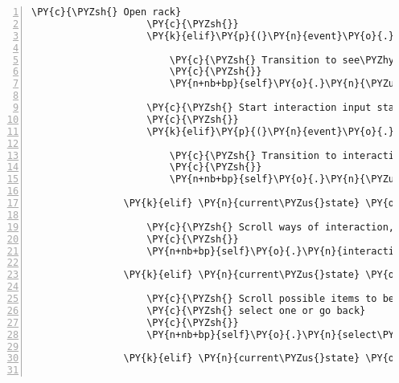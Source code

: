 \begin{Verbatim}[commandchars=\\\{\},numbers=left,firstnumber=1,stepnumber=1]
                    \PY{c}{\PYZsh{} Open rack}
                    \PY{c}{\PYZsh{}}
                    \PY{k}{elif}\PY{p}{(}\PY{n}{event}\PY{o}{.}\PY{n}{key} \PY{o}{==} \PY{n}{pygame}\PY{o}{.}\PY{n}{K\PYZus{}q}\PY{p}{)}\PY{p}{:}

                        \PY{c}{\PYZsh{} Transition to see\PYZhy{}rack\PYZhy{}input\PYZhy{}state}
                        \PY{c}{\PYZsh{}}
                        \PY{n+nb+bp}{self}\PY{o}{.}\PY{n}{\PYZus{}push\PYZus{}input\PYZus{}state\PYZus{}on\PYZus{}stack}\PY{p}{(}\PY{n+nb+bp}{self}\PY{o}{.}\PY{n}{INPUT\PYZus{}STATE\PYZus{}SEE\PYZus{}RACK}\PY{p}{)}

                    \PY{c}{\PYZsh{} Start interaction input state}
                    \PY{c}{\PYZsh{}}
                    \PY{k}{elif}\PY{p}{(}\PY{n}{event}\PY{o}{.}\PY{n}{key} \PY{o}{==} \PY{n}{pygame}\PY{o}{.}\PY{n}{K\PYZus{}e}\PY{p}{)}\PY{p}{:}

                        \PY{c}{\PYZsh{} Transition to interaction\PYZhy{}menu\PYZhy{}input\PYZhy{}state}
                        \PY{c}{\PYZsh{}}
                        \PY{n+nb+bp}{self}\PY{o}{.}\PY{n}{\PYZus{}push\PYZus{}input\PYZus{}state\PYZus{}on\PYZus{}stack}\PY{p}{(}\PY{n+nb+bp}{self}\PY{o}{.}\PY{n}{INPUT\PYZus{}STATE\PYZus{}INTERACTION}\PY{p}{)}

                \PY{k}{elif} \PY{n}{current\PYZus{}state} \PY{o}{==} \PY{n+nb+bp}{self}\PY{o}{.}\PY{n}{INPUT\PYZus{}STATE\PYZus{}INTERACTION}\PY{p}{:}

                    \PY{c}{\PYZsh{} Scroll ways of interaction, select one or go back}
                    \PY{c}{\PYZsh{}}
                    \PY{n+nb+bp}{self}\PY{o}{.}\PY{n}{interaction\PYZus{}sound\PYZus{}menu}\PY{o}{.}\PY{n}{process\PYZus{}key\PYZus{}input}\PY{p}{(}\PY{n}{event}\PY{o}{.}\PY{n}{key}\PY{p}{)}

                \PY{k}{elif} \PY{n}{current\PYZus{}state} \PY{o}{==} \PY{n+nb+bp}{self}\PY{o}{.}\PY{n}{INPUT\PYZus{}STATE\PYZus{}SELECT\PYZus{}ITEM}\PY{p}{:}

                    \PY{c}{\PYZsh{} Scroll possible items to be used to drop on a target,}
                    \PY{c}{\PYZsh{} select one or go back}
                    \PY{c}{\PYZsh{}}
                    \PY{n+nb+bp}{self}\PY{o}{.}\PY{n}{select\PYZus{}item\PYZus{}menu}\PY{o}{.}\PY{n}{process\PYZus{}key\PYZus{}input}\PY{p}{(}\PY{n}{event}\PY{o}{.}\PY{n}{key}\PY{p}{)}

                \PY{k}{elif} \PY{n}{current\PYZus{}state} \PY{o}{==} \PY{n+nb+bp}{self}\PY{o}{.}\PY{n}{INPUT\PYZus{}STATE\PYZus{}SELECT\PYZus{}TARGET}\PY{p}{:}


\end{Verbatim}
